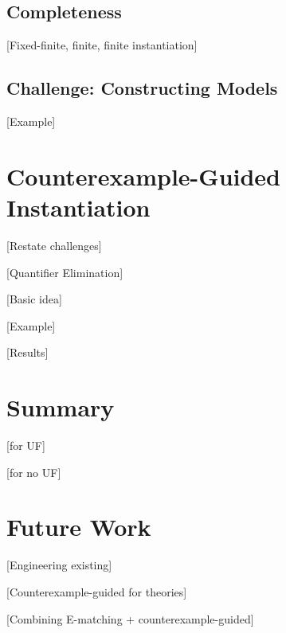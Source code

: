 \documentclass[oribibl]{llncs}
\begin{document}
\subsection{Completeness}

[Fixed-finite, finite, finite instantiation]

\subsection{Challenge: Constructing Models}

[Example]

\section{Counterexample-Guided Instantiation}

[Restate challenges]

[Quantifier Elimination]

[Basic idea]

[Example]

[Results]

\section{Summary}

[for UF]

[for no UF]

\section{Future Work}

[Engineering existing]

[Counterexample-guided for theories]

[Combining E-matching + counterexample-guided]



\end{document}

